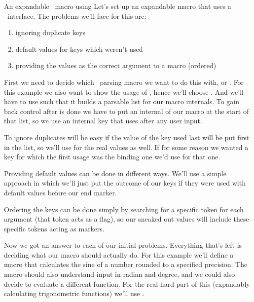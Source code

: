 \begin{example}{An expandable \kv\ macro using }
  Let's set up an expandable macro that uses a \kv\ interface. The problems
  we'll face for this are:
  \begin{enumerate}
    \item ignoring duplicate keys
    \item default values for keys which weren't used
    \item providing the values as the correct argument to a macro (ordered)
  \end{enumerate}

  First we need to decide which \kv\ parsing macro we want to do this with,
   or . For this example we also want to show the usage
  of , hence we'll choose . And we'll have to use
   such that it builds a parsable list for our macro internals. To
  gain back control after  is done we have to put an internal of our
  macro at the start of that list, so we use an internal key that uses
   after any user input.

  To ignore duplicates will be easy if the value of the key used last will be
  put first in the list, so we'll use  for the real values as
  well. If for some reason we wanted a key for which the first usage was the
  binding one we'd use  for that one.

  Providing default values can be done in different ways. We'll use a simple
  approach in which we'll just put the outcome of our keys if they were used
  with default values before our end marker.

  Ordering the keys can be done simply by searching for a specific token for
  each argument (that token acts as a flag), so our sneaked out values will
  include these specific tokens acting as markers.

  Now we got an answer to each of our initial problems. Everything that's left
  is deciding what our macro should actually do. For this example we'll define a
  macro that calculates the sine of a number rounded to a specified precision.
  The macro should also understand input in radian and degree, and we could also
  decide to evaluate a different function. For the real hard part of this
  (expandably calculating trigonometric functions) we'll use .


\end{example}
